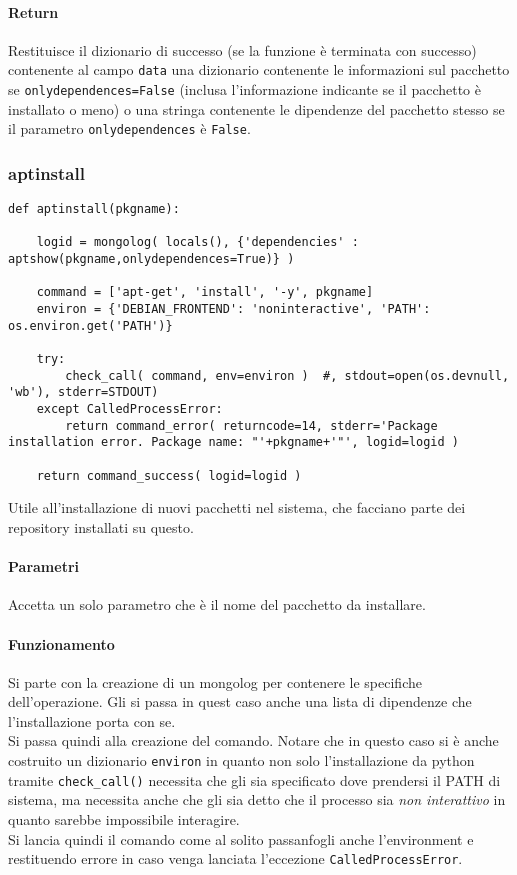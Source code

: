 \documentclass[11pt]{article}
\begin{document}
\paragraph{Return}
Restituisce il dizionario di successo (se la funzione è terminata con successo) contenente al campo \texttt{data}
una dizionario contenente le informazioni sul pacchetto se \texttt{onlydependences=False} (inclusa l'informazione indicante
se il pacchetto è installato o meno) o una stringa contenente le dipendenze del pacchetto stesso se il parametro
\texttt{onlydependences} è \texttt{False}.

\subsubsection{aptinstall}\label{aptinstall}
\begin{lstlisting}
def aptinstall(pkgname):
    
    logid = mongolog( locals(), {'dependencies' : aptshow(pkgname,onlydependences=True)} )

    command = ['apt-get', 'install', '-y', pkgname]
    environ = {'DEBIAN_FRONTEND': 'noninteractive', 'PATH': os.environ.get('PATH')}

    try:
        check_call( command, env=environ )  #, stdout=open(os.devnull, 'wb'), stderr=STDOUT)
    except CalledProcessError:
        return command_error( returncode=14, stderr='Package installation error. Package name: "'+pkgname+'"', logid=logid )

    return command_success( logid=logid )
\end{lstlisting}
Utile all'installazione di nuovi pacchetti nel sistema, che facciano parte dei repository installati su questo.
\paragraph{Parametri}
Accetta un solo parametro che è il nome del pacchetto da installare.
\paragraph{Funzionamento}
Si parte con la creazione di un mongolog per contenere le specifiche dell'operazione. Gli si passa in quest caso
anche una lista di dipendenze che l'installazione porta con se.\\
Si passa quindi alla creazione del comando. Notare che in questo caso si è anche costruito un dizionario \texttt{environ}
in quanto non solo l'installazione da python tramite \texttt{check\_call()} necessita che gli sia specificato dove
prendersi il PATH di sistema, ma necessita anche che gli sia detto che il processo sia \textit{non interattivo} in quanto
sarebbe impossibile interagire.\\
Si lancia quindi il comando come al solito passanfogli anche l'environment e restituendo errore in caso venga lanciata
l'eccezione \texttt{CalledProcessError}.
\end{document}
